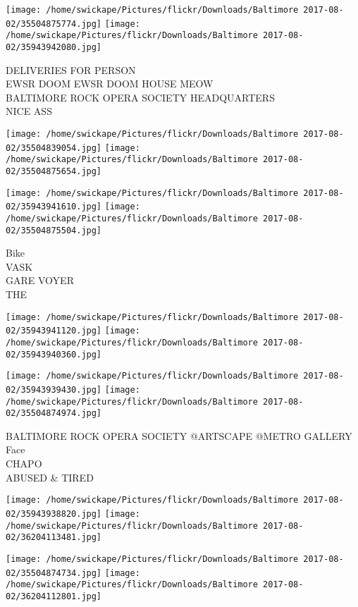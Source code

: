 \documentclass[10pt,letterpaper]{article}
\begin{document}
\texttt{[image: /home/swickape/Pictures/flickr/Downloads/Baltimore 2017-08-02/35504875774.jpg]}
\texttt{[image: /home/swickape/Pictures/flickr/Downloads/Baltimore 2017-08-02/35943942080.jpg]}

DELIVERIES FOR PERSON\\
EWSR DOOM EWSR DOOM HOUSE MEOW\\
BALTIMORE ROCK OPERA SOCIETY HEADQUARTERS\\
NICE ASS\\
\pagebreak

\texttt{[image: /home/swickape/Pictures/flickr/Downloads/Baltimore 2017-08-02/35504839054.jpg]}
\texttt{[image: /home/swickape/Pictures/flickr/Downloads/Baltimore 2017-08-02/35504875654.jpg]}

\texttt{[image: /home/swickape/Pictures/flickr/Downloads/Baltimore 2017-08-02/35943941610.jpg]}
\texttt{[image: /home/swickape/Pictures/flickr/Downloads/Baltimore 2017-08-02/35504875504.jpg]}

Bike\\
VASK\\
GARE VOYER\\
THE\\
\pagebreak

\texttt{[image: /home/swickape/Pictures/flickr/Downloads/Baltimore 2017-08-02/35943941120.jpg]}
\texttt{[image: /home/swickape/Pictures/flickr/Downloads/Baltimore 2017-08-02/35943940360.jpg]}

\texttt{[image: /home/swickape/Pictures/flickr/Downloads/Baltimore 2017-08-02/35943939430.jpg]}
\texttt{[image: /home/swickape/Pictures/flickr/Downloads/Baltimore 2017-08-02/35504874974.jpg]}

BALTIMORE ROCK OPERA SOCIETY @ARTSCAPE @METRO GALLERY\\
Face\\
CHAPO\\
ABUSED \& TIRED\\
\pagebreak

\texttt{[image: /home/swickape/Pictures/flickr/Downloads/Baltimore 2017-08-02/35943938820.jpg]}
\texttt{[image: /home/swickape/Pictures/flickr/Downloads/Baltimore 2017-08-02/36204113481.jpg]}

\texttt{[image: /home/swickape/Pictures/flickr/Downloads/Baltimore 2017-08-02/35504874734.jpg]}
\texttt{[image: /home/swickape/Pictures/flickr/Downloads/Baltimore 2017-08-02/36204112801.jpg]}
\end{document}
